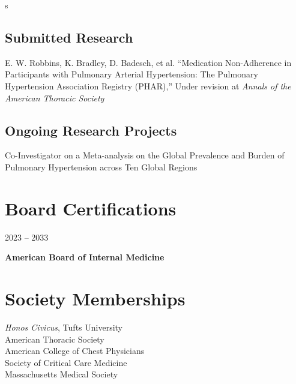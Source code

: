 s\documentclass{article}
\newcommand\colleft{.20}
\newcommand\colright{.75}
\newcommand{\entryfour}[4]
	{
		\begin{minipage}[t]{\colleft\textwidth}
		\hfill \textsc{#1}
		\end{minipage}
		\hfill\vline\hfill
		\begin{minipage}[t]{\colright\textwidth}
		{\bf#2}\\
		\textit{#3}
		\footnotesize{#4}
		\end{minipage}\\
		\entryvspace
	}%
\newcommand{\entrytwo}[2]
{
	\begin{minipage}[t]{\colleft\textwidth}
		\hfill \textsc{#1}
	\end{minipage}
	\hfill\vline\hfill
	\begin{minipage}[t]{\colright\textwidth}
		{\bf#2}
	\end{minipage}
	\entryvspace
}%
\newcommand{\entryvspace}{\vspace{0.5em}}
\begin{document}
	\subsection*{Submitted Research}
		E. W. Robbins, K. Bradley, D. Badesch, et al. ``Medication Non-Adherence in Participants with Pulmonary Arterial Hypertension: The Pulmonary Hypertension Association Registry (PHAR),'' Under revision at \emph{Annals of the American Thoracic Society}
	\subsection*{Ongoing Research Projects}
		Co-Investigator on a Meta-analysis on the Global Prevalence and Burden of Pulmonary Hypertension across Ten Global Regions
	
	
	\section*{Board Certifications}
		\entrytwo{2023 -- 2033}{American Board of Internal Medicine}
	\section*{Society Memberships}
		\emph{Honos Civicus}, Tufts University\\
		American Thoracic Society\\
		American College of Chest Physicians\\
		Society of Critical Care Medicine\\
		Massachusetts Medical Society
		
\end{document}
